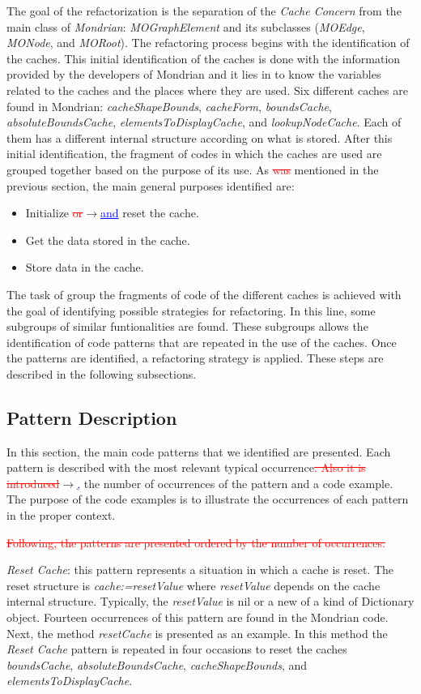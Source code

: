 \documentclass[runningheads]{llncs}
\newcommand{\ra}{$\rightarrow$}
\newcommand{\del}[1]{\textcolor{red}{\sout{#1}}} %
\newcommand{\chg}[2]{\textcolor{red}{\sout{#1}}{\ra}\textcolor{blue}{\uline{#2}}} %
\begin{document}
The goal of the refactorization is the separation of the \emph{Cache
Concern} from the main class of \emph{Mondrian}: \emph{MOGraphElement}
and its subclasses (\emph{MOEdge}, \emph{MONode}, and \emph{MORoot}).
The refactoring process begins with the identification of the caches.
This initial identification of the caches is done with the information
provided by the developers of Mondrian and it lies in to know the
variables related to the caches and the places where they are used.
Six different caches are found in Mondrian: \emph{cacheShapeBounds},
\emph{cacheForm}, \emph{boundsCache}, \emph{absoluteBoundsCache},
\emph{elementsToDisplayCache}, and \emph{lookupNodeCache}. Each of
them has a different internal structure according on what is stored.
After this initial identification, the fragment of codes in which
the caches are used are grouped together based on the purpose of its
use. As \del{was} mentioned in the previous section, the main general purposes
identified are: 
\begin{itemize}
\item Initialize \chg{or}{and} reset the cache. 
\item Get the data stored in the cache. 
\item Store data in the cache. 
\end{itemize}
The task of group the fragments of code of the different caches is
achieved with the goal of identifying possible strategies for refactoring.
In this line, some subgroups of similar funtionalities are found.
These subgroups allows the identification of code patterns that are
repeated in the use of the caches. Once the patterns are identified,
a refactoring strategy is applied. These steps are described in the
following subsections.


\subsection{Pattern Description\label{sub:Pattern-Identification}}

In this section, the main code patterns that we identified are presented.
Each pattern is described with the most relevant typical occurrence\chg{.
Also it is introduced}{,} the number of occurrences of the pattern and
a code example. The purpose of the code examples is to illustrate
the occurrences of each pattern in the proper context.

\del{Following, the patterns are presented ordered by the number of occurrences.}

\emph{Reset Cache}: this pattern represents a situation in which a
cache is reset. The reset structure is \emph{cache:=resetValue} where
\emph{resetValue} depends on the cache internal structure. Typically,
the \emph{resetValue} is nil or a new of a kind of Dictionary object.
Fourteen occurrences of this pattern are found in the Mondrian code.
Next, the method \emph{resetCache} is presented as an example. In
this method the \emph{Reset Cache} pattern is repeated in four occasions
to reset the caches \emph{boundsCache}, \emph{absoluteBoundsCache},
\emph{cacheShapeBounds}, and \emph{elementsToDisplayCache}.
\end{document}
